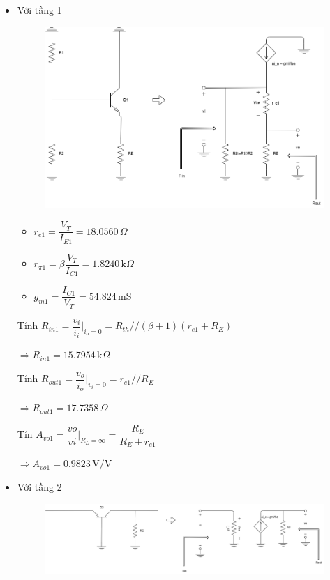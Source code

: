 \begin{itemize}[label=-]
	\item Với tầng 1
	
	\begin{figure}[H]
		\centering
		\includegraphics[width=.8\linewidth]{./my-chapters/my-diagrams/Question5/cauc_stage1.png}
	\end{figure}
	
	\begin{itemize}[label=+, leftmargin=2cm]
		\item $r_{e1} = \dfrac{V_{T}}{I_{E1}} = 18.0560\,\Omega$
		\item $r_{\pi1} = \beta\dfrac{V_{T}}{I_{C1}} = 1.8240\,\text{k}\Omega$
		\item $g_{m1} = \dfrac{I_{C1}}{V_{T}} = 54.824\,\text{mS}$
	\end{itemize}
	
	Tính $R_{in1} = \dfrac{v_{i}}{i_{i}}\bigg|_{i_{o} = 0} = R_{th} // (\beta + 1)(r_{e1} + R_{E})$
	
	$\Rightarrow R_{in1} = 15.7954\,\text{k}\Omega$
	
	Tính $R_{out1} = \dfrac{v_{o}}{i_{o}}\bigg|_{v_{i} = 0} = r_{e1} // R_{E}$
	
	$\Rightarrow R_{out1} = 17.7358\,\Omega$
	
	Tín $A_{vo1} = \dfrac{vo}{vi}\bigg|_{R_{L} = \infty} = \dfrac{R_{E}}{R_{E} + r_{e1}}$
	
	$\Rightarrow A_{vo1} = 0.9823\,\text{V/V}$
	\item Với tầng 2
	
	\begin{figure}[H]
		\centering
		\includegraphics[width=.8\linewidth]{./my-chapters/my-diagrams/Question5/cauc_stagte2.png}
	\end{figure}
	

\end{itemize}
